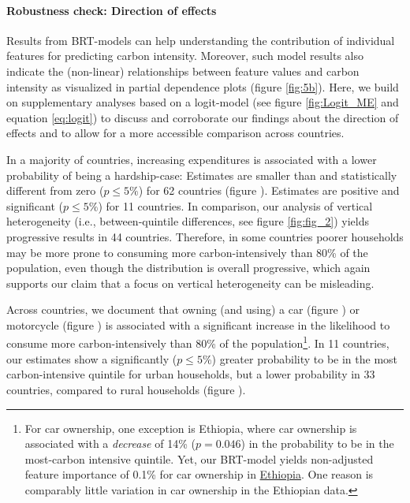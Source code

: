 \documentclass[12pt, a4paper]{article}
\begin{document}
\paragraph{Robustness check: Direction of effects}
Results from BRT-models can help understanding the contribution of individual features for predicting carbon intensity. Moreover, such model results also indicate the (non-linear) relationships between feature values and carbon intensity as visualized in partial dependence plots (figure \ref{fig:5b}). Here, we build on supplementary analyses based on a logit-model (see figure \ref{fig:Logit_ME} and equation \ref{eq:logit}) to discuss and corroborate our findings about the direction of effects and to allow for a more accessible comparison across countries.

In a majority of countries, increasing expenditures is associated with a lower probability of being a hardship-case: Estimates are smaller than and statistically different from zero ($p\leq 5\%$) for 62 countries (figure ). Estimates are positive and significant ($p\leq 5\%$) for 11 countries. In comparison, our analysis of vertical heterogeneity (i.e., between-quintile differences, see figure \ref{fig:fig_2}) yields progressive results in 44 countries. Therefore, in some countries poorer households may be more prone to consuming more carbon-intensively than 80\% of the population, even though the distribution is overall progressive, which again supports our claim that a focus on vertical heterogeneity can be misleading.

Across countries, we document that owning (and using) a car (figure ) or motorcycle (figure ) is associated with a significant increase in the likelihood to consume more carbon-intensively than 80\% of the population\footnote{For car ownership, one exception is Ethiopia, where car ownership is associated with a \textit{decrease} of 14\% ($p=0.046$) in the probability to be in the most-carbon intensive quintile. Yet, our BRT-model yields non-adjusted feature importance of 0.1\% for car ownership in \hyperref[fig:5b_ETH]{Ethiopia}. One reason is comparably little variation in car ownership in the Ethiopian data.}. In 11 countries, our estimates show a significantly ($p\leq 5\%$) greater probability to be in the most carbon-intensive quintile for urban households, but a lower probability in 33 countries, compared to rural households (figure ).
\end{document}
